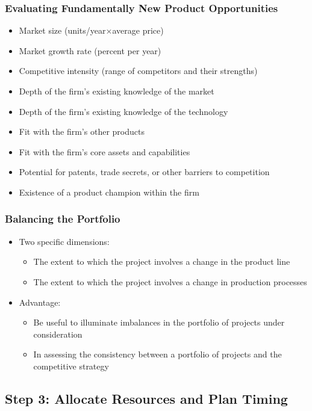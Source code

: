 \documentclass[openany,12pt,a4paper]{book}
\begin{document}
\subsubsection{Evaluating Fundamentally New Product Opportunities}
\begin{itemize}
    \item Market size (units/year$\times$average price)
    \item Market growth rate (percent per year)
    \item Competitive intensity (range of competitors and their strengths)
    \item Depth of the firm's existing knowledge of the market
    \item Depth of the firm's existing knowledge of the technology
    \item Fit with the firm's other products
    \item Fit with the firm's core assets and capabilities
    \item Potential for patents, trade secrets, or other barriers to competition
    \item Existence of a product champion within the firm
\end{itemize}

\subsubsection{Balancing the Portfolio}
\begin{itemize}
    \item Two specific dimensions:
    \begin{itemize}
        \item The extent to which the project involves a change in the product line
        \item The extent to which the project involves a change in production processes
    \end{itemize}
    \item Advantage:
    \begin{itemize}
        \item Be useful to illuminate imbalances in the portfolio of projects under consideration 
        \item In assessing the consistency between a portfolio of projects and the competitive strategy
    \end{itemize}
\end{itemize}

\subsection{Step 3: Allocate Resources and Plan Timing}
\end{document}

